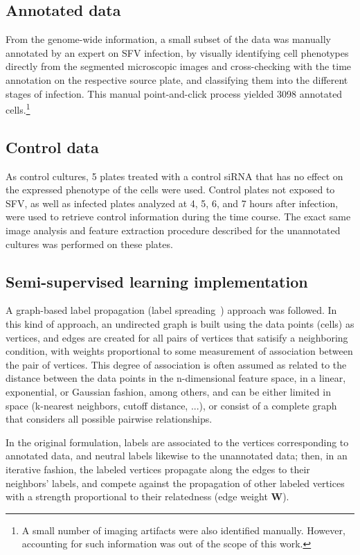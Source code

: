 \documentclass[oneside, a4paper, draft]{memoir} %
\begin{document}
\subsection{Annotated data}
From the genome-wide information, a small subset of the data was manually annotated by an expert on SFV infection, by
visually identifying cell phenotypes directly from the segmented microscopic images and cross-checking with the time
annotation on the respective source plate, and classifying them into the different stages of infection. This manual
point-and-click process yielded  3098 annotated cells.\footnote{A small number of
imaging artifacts were also identified manually. However, accounting for such information was out of the scope of
this work.}

\subsection{Control data}
As control cultures, 5 plates treated with a control siRNA that has no effect on the expressed phenotype of the cells
were used. Control plates not exposed to SFV, as well as infected plates analyzed at 4, 5, 6, and 7 hours after
infection, were used to retrieve control information during the time course. The exact same image analysis and
feature extraction procedure described for the unannotated cultures was performed on these plates. 

\subsection{Semi-supervised learning implementation}
A graph-based label propagation (label spreading~\cite{zhou2004learning}) approach was followed. In this kind of
approach, an undirected graph is built using the data points (cells) as vertices, and edges are created for all pairs
of vertices that satisify a neighboring condition, with weights proportional to some measurement of association
between the pair of vertices. This degree of association is often assumed as related to the distance
between the data points in the n-dimensional feature space, in a linear, exponential, or Gaussian fashion, among
others, and can be either limited in space (k-nearest neighbors, cutoff distance, ...), or consist of a
complete graph that considers all possible pairwise relationships.

In the original formulation, labels are associated to the vertices corresponding to annotated data, and neutral labels
likewise to the unannotated data; then, in an iterative fashion, the labeled vertices propagate along the edges to
their neighbors' labels, and compete against the propagation of other labeled vertices with a strength proportional to
their relatedness (edge weight $\mathbf W$).
\end{document}
